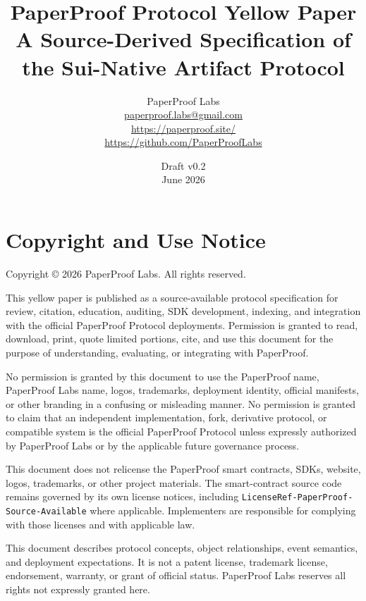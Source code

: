 \documentclass[11pt]{article}
\title{\textbf{PaperProof Protocol Yellow Paper}\\
\large A Source-Derived Specification of the Sui-Native Artifact Protocol}
\author{PaperProof Labs\\
\href{mailto:paperproof.labs@gmail.com}{paperproof.labs@gmail.com}\\
\href{https://paperproof.site/}{https://paperproof.site/}\\
\href{https://github.com/PaperProofLabs}{https://github.com/PaperProofLabs}}
\date{Draft v0.2 \\ June 2026}
\newcommand{\code}[1]{\texttt{#1}}
\begin{document}
\maketitle

\section*{Copyright and Use Notice}

Copyright \copyright{} 2026 PaperProof Labs. All rights reserved.

This yellow paper is published as a source-available protocol specification for
review, citation, education, auditing, SDK development, indexing, and integration
with the official PaperProof Protocol deployments. Permission is granted to read,
download, print, quote limited portions, cite, and use this document for the
purpose of understanding, evaluating, or integrating with PaperProof.

No permission is granted by this document to use the PaperProof name, PaperProof
Labs name, logos, trademarks, deployment identity, official manifests, or other
branding in a confusing or misleading manner. No permission is granted to claim
that an independent implementation, fork, derivative protocol, or compatible
system is the official PaperProof Protocol unless expressly authorized by
PaperProof Labs or by the applicable future governance process.

This document does not relicense the PaperProof smart contracts, SDKs, website,
logos, trademarks, or other project materials. The smart-contract source code
remains governed by its own license notices, including
\code{LicenseRef-PaperProof-Source-Available} where applicable. Implementers are
responsible for complying with those licenses and with applicable law.

This document describes protocol concepts, object relationships, event
semantics, and deployment expectations. It is not a patent license, trademark
license, endorsement, warranty, or grant of official status. PaperProof Labs
reserves all rights not expressly granted here.
\end{document}

